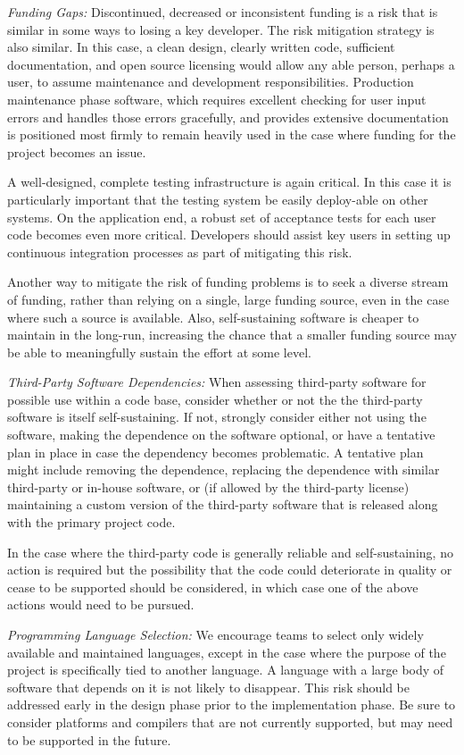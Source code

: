 \documentclass[11pt]{SANDreport}
\begin{document}
{}\textit{Funding Gaps:} Discontinued, decreased or inconsistent funding is a risk that is similar in some ways to losing a key developer.  The risk mitigation strategy is also similar.  In this case, a clean design, clearly written code, sufficient documentation, and open source licensing would allow any able person, perhaps a user, to assume maintenance and development responsibilities.  Production maintenance phase software, which requires excellent checking for user input errors and handles those errors gracefully, and provides extensive documentation is positioned most firmly to remain heavily used in the case where funding for the project becomes an issue.

A well-designed, complete testing infrastructure is again critical. In this case it is particularly important that the testing system be easily deploy-able on other systems.  On the application end, a robust set of acceptance tests for each user code becomes even more critical. Developers should assist key users in setting up continuous integration processes as part of mitigating this risk.

Another way to mitigate the risk of funding problems is to seek a diverse stream of funding, rather than relying on a single, large funding source, even in the case where such a source is available.  Also, self-sustaining software is cheaper to maintain in the long-run, increasing the chance that a smaller funding source may be able to meaningfully sustain the effort at some level.

{}\textit{Third-Party Software Dependencies:} When assessing third-party software for possible use within a code base, consider whether or not the the third-party software is itself self-sustaining. If not, strongly consider either not using the software, making the dependence on the software optional, or have a tentative plan in place in case the dependency becomes problematic.  A tentative plan might include removing the dependence, replacing the dependence with similar third-party or in-house software, or (if allowed by the third-party license) maintaining a custom version of the third-party software that is released along with the primary project code.

In the case where the third-party code is generally reliable and self-sustaining, no action is required but the possibility that the code could deteriorate in quality or cease to be supported should be considered, in which case one of the above actions would need to be pursued.

{}\textit{Programming Language Selection:} We encourage teams to select only widely available and maintained languages, except in the case where the purpose of the project is specifically tied to another language.  A language with a large body of software that depends on it is not likely to disappear.  This risk should be addressed early in the design phase prior to the implementation phase.  Be sure to consider platforms and compilers that are not currently supported, but may need to be supported in the future.
\end{document}
